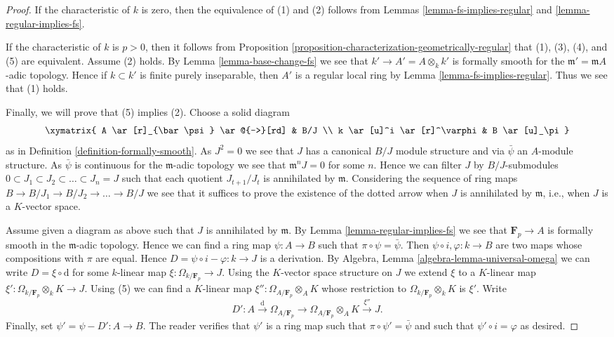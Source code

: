 \begin{proof}
If the characteristic of $k$ is zero, then the equivalence of (1) and (2)
follows from
Lemmas \ref{lemma-fs-implies-regular} and \ref{lemma-regular-implies-fs}.

\medskip\noindent
If the characteristic of $k$ is $p > 0$, then it follows from
Proposition \ref{proposition-characterization-geometrically-regular}
that (1), (3), (4), and (5) are equivalent. Assume (2) holds.
By Lemma \ref{lemma-base-change-fs} we see that
$k' \to A' = A \otimes_k k'$ is formally smooth for the
$\mathfrak m' = \mathfrak mA$-adic topology. Hence if $k \subset k'$ is
finite purely inseparable, then $A'$ is a regular local ring by
Lemma \ref{lemma-fs-implies-regular}. Thus we see that (1) holds.

\medskip\noindent
Finally, we will prove that (5) implies (2). Choose a solid diagram
$$
\xymatrix{
A \ar[r]_{\bar\psi} \ar@{-->}[rd] & B/J \\
k \ar[u]^i \ar[r]^\varphi & B \ar[u]_\pi
}
$$
as in Definition \ref{definition-formally-smooth}. As $J^2 = 0$ we see
that $J$ has a canonical $B/J$ module structure and via $\bar\psi$ an
$A$-module structure. As $\bar\psi$ is continuous for the
$\mathfrak m$-adic topology we see that $\mathfrak m^nJ = 0$ for some $n$.
Hence we can filter $J$ by $B/J$-submodules
$0 \subset J_1 \subset J_2 \subset \ldots \subset J_n = J$
such that each quotient $J_{t + 1}/J_t$ is annihilated by $\mathfrak m$.
Considering the sequence of ring maps
$B \to B/J_1 \to B/J_2 \to \ldots \to B/J$
we see that it suffices to prove the existence of the dotted arrow when
$J$ is annihilated by $\mathfrak m$, i.e., when $J$ is a $K$-vector space.

\medskip\noindent
Assume given a diagram as above such that $J$ is annihilated by $\mathfrak m$.
By Lemma \ref{lemma-regular-implies-fs} we see that $\mathbf{F}_p \to A$ is
formally smooth in the $\mathfrak m$-adic topology. Hence we can find a ring
map $\psi : A \to B$ such that $\pi \circ \psi = \bar \psi$. Then
$\psi \circ i, \varphi : k \to B$ are two maps whose compositions with $\pi$
are equal. Hence $D = \psi \circ i - \varphi : k \to J$ is a derivation.
By Algebra, Lemma \ref{algebra-lemma-universal-omega} we can write
$D = \xi \circ \text{d}$ for some $k$-linear map
$\xi : \Omega_{k/\mathbf{F}_p} \to J$. Using the $K$-vector space structure
on $J$ we extend $\xi$ to a $K$-linear map
$\xi' : \Omega_{k/\mathbf{F}_p} \otimes_k K \to J$.
Using (5) we can find a $K$-linear map
$\xi'' : \Omega_{A/\mathbf{F}_p} \otimes_A K$ whose restriction to
$\Omega_{k/\mathbf{F}_p} \otimes_k K$ is $\xi'$. Write
$$
D' : A \xrightarrow{\text{d}} \Omega_{A/\mathbf{F}_p}
\to \Omega_{A/\mathbf{F}_p} \otimes_A K \xrightarrow{\xi''} J.
$$
Finally, set $\psi' = \psi - D' : A \to B$. The reader verifies that $\psi'$
is a ring map such that $\pi \circ \psi' = \bar \psi$ and such that
$\psi' \circ i = \varphi$ as desired.
\end{proof}

